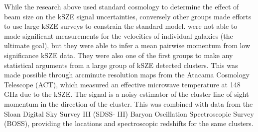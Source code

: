\documentclass[manuscript]{aastex}
\begin{document}
While the research above used standard cosmology to determine the effect of beam size on the kSZE signal uncertainties, conversely other groups made efforts to use large kSZE surveys to constrain the standard model. \cite{Hand2012} were not able to made significant measurements for the velocities of individual galaxies (the ultimate goal), but they were able to infer a mean pairwise momentum from low significance kSZE data. They were also one of the first groups to make any statistical arguments from a large group of kSZE detected clusters. This was made possible through arcminute resolution maps from the Atacama Cosmology Telescope (ACT), which measured an effective microwave temperature at 148 GHz due to the kSZE. The signal is a noisy estimator of the cluster line of sight momentum in the direction of the cluster. This was combined with data from the Sloan Digital Sky Survey III (SDSS- III) Baryon Oscillation Spectroscopic Survey (BOSS), providing the locations and spectroscopic redshifts for the same clusters. 
\end{document}
